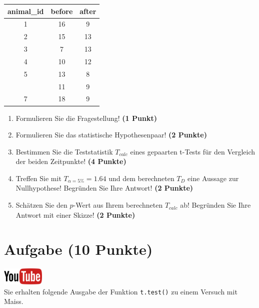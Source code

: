 \documentclass[a4paper, 9pt]{scrartcl}\usepackage[]{graphicx}\usepackage[]{xcolor}
\begin{document}
\begin{table}[!h]
\centering
\begin{tabular}{ccc}
\toprule
animal\_id & before & after\\
\midrule
1 & 16 & 9\\
2 & 15 & 13\\
3 & 7 & 13\\
4 & 10 & 12\\
5 & 13 & 8\\
\addlinespace
6 & 11 & 9\\
7 & 18 & 9\\
\bottomrule
\end{tabular}
\end{table}



\begin{enumerate}
\item Formulieren Sie die Fragestellung! \textbf{(1 Punkt)}
\item Formulieren Sie das statistische Hypothesenpaar! \textbf{(2
    Punkte)}
\item Bestimmen Sie die Teststatistik $T_{calc}$ eines gepaarten t-Tests f{\"u}r den
  Vergleich der beiden Zeitpunkte! \textbf{(4 Punkte)}
\item Treffen Sie mit $T_{\alpha = 5\%} = 1.64$ und dem berechneten $T_{D}$ eine Aussage
  zur Nullhypothese! Begr{\"u}nden Sie Ihre Antwort! \textbf{(2 Punkte)}
\item Sch{\"a}tzen Sie den $p$-Wert aus Ihrem berechneten $T_{calc}$ ab!
  Begr{\"u}nden Sie Ihre Antwort mit einer Skizze! \textbf{(2
    Punkte)}
\end{enumerate} 
\clearpage

\section{Aufgabe \hfill (10 Punkte)}

\hfill\href{https://youtu.be/exDo7AyHl4Q}{\includegraphics[width =
  2cm]{img/youtube}}\\[1Ex]



Sie erhalten folgende \Rlogo Ausgabe der Funktion \texttt{t.test()} zu einem Versuch mit Maiss.
\end{document}
